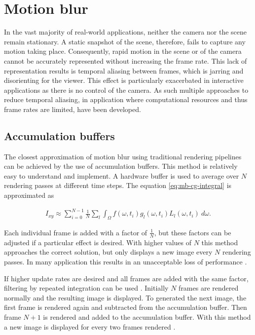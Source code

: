 \chapter{Motion blur}
\label{ch:mb}
In the vast majority of real-world applications, neither the camera nor the scene remain stationary.
A static snapshot of the scene, therefore, fails to capture any motion taking place.
Consequently, rapid motion in the scene or of the camera cannot be accurately represented without increasing the frame rate.
This lack of representation results is temporal aliasing between frames, which is jarring and disorienting for the viewer.
This effect is particularly exacerbated in interactive applications as there is no control of the camera.
As such multiple approaches to reduce temporal aliasing, in application where computational resources and thus frame rates are limited, have been developed.

\section{Accumulation buffers}
\label{ch:mb-acc}
The closest approximation of motion blur using traditional rendering pipelines can be achieved by the use of accumulation buffers.
This method is relatively easy to understand and implement.
A hardware buffer is used to average over $N$ rendering passes at different time steps.
The equation \ref{eq:mb-cg-integral} is approximated as

\begin{align}
    I_{xy} \approx \sum_{i=0}^{N-1} \frac{1}{N} \sum_{l} \int_\Omega f(\omega, t_i) g_l(\omega, t_i) L_l(\omega, t_i) \: d\omega.
\end{align}

Each individual frame is added with a factor of $\frac{1}{N}$, but these factors can be adjusted if a particular effect is desired.
With higher values of $N$ this method approaches the correct solution, but only displays a new image every $N$ rendering passes.
In many application this results in an unacceptable loss of performance \cite{Haeberli.1990}.

If higher update rates are desired and all frames are added with the same factor, filtering by repeated integration can be used \cite{Heckbert.1986}.
Initially $N$ frames are rendered normally and the resulting image is displayed.
To generated the next image, the first frame is rendered again and subtracted from the accumulation buffer.
Then frame $N+1$ is rendered and added to the accumulation buffer.
With this method a new image is displayed for every two frames rendered \cite{Haeberli.1990}.

